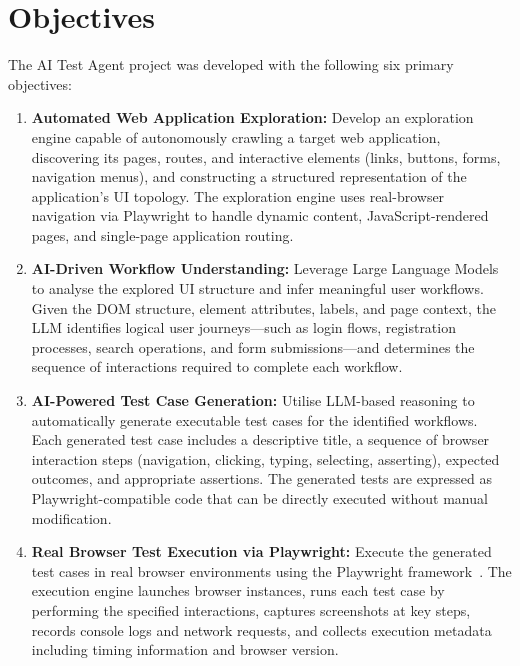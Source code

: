 \section{Objectives}
\label{sec:objectives}

The AI Test Agent project was developed with the following six primary objectives:

\begin{enumerate}
    \item \textbf{Automated Web Application Exploration:} Develop an exploration engine capable of autonomously crawling a target web application, discovering its pages, routes, and interactive elements (links, buttons, forms, navigation menus), and constructing a structured representation of the application's UI topology. The exploration engine uses real-browser navigation via Playwright to handle dynamic content, JavaScript-rendered pages, and single-page application routing.

    \item \textbf{AI-Driven Workflow Understanding:} Leverage Large Language Models to analyse the explored UI structure and infer meaningful user workflows. Given the DOM structure, element attributes, labels, and page context, the LLM identifies logical user journeys---such as login flows, registration processes, search operations, and form submissions---and determines the sequence of interactions required to complete each workflow.

    \item \textbf{AI-Powered Test Case Generation:} Utilise LLM-based reasoning to automatically generate executable test cases for the identified workflows. Each generated test case includes a descriptive title, a sequence of browser interaction steps (navigation, clicking, typing, selecting, asserting), expected outcomes, and appropriate assertions. The generated tests are expressed as Playwright-compatible code that can be directly executed without manual modification.

    \item \textbf{Real Browser Test Execution via Playwright:} Execute the generated test cases in real browser environments using the Playwright framework~\cite{playwright2024}. The execution engine launches browser instances, runs each test case by performing the specified interactions, captures screenshots at key steps, records console logs and network requests, and collects execution metadata including timing information and browser version.


\end{enumerate}
